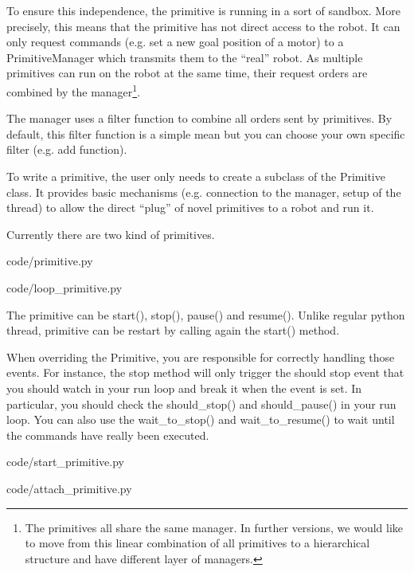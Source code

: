 To ensure this independence, the primitive is running in a sort of sandbox. More precisely, this means that the primitive has not direct access to the robot. It can only request commands (e.g. set a new goal position of a motor) to a PrimitiveManager which transmits them to the “real” robot. As multiple primitives can run on the robot at the same time, their request orders are combined by the manager\footnote{The primitives all share the same manager. In further versions, we would like to move from this linear combination of all primitives to a hierarchical structure and have different layer of managers.}.

The manager uses a filter function to combine all orders sent by primitives. By default, this filter function is a simple mean but you can choose your own specific filter (e.g. add function).

To write a primitive, the user only needs to create a subclass of the Primitive class. It provides basic mechanisms (e.g. connection to the manager, setup of the thread) to allow the direct “plug” of novel primitives to a robot and run it.

Currently there are two kind of primitives.



    {code/primitive.py}


    {code/loop_primitive.py}

The primitive can be start(), stop(), pause() and resume(). Unlike regular python thread, primitive can be restart by calling again the start() method.

When overriding the Primitive, you are responsible for correctly handling those events. For instance, the stop method will only trigger the should stop event that you should watch in your run loop and break it when the event is set. In particular, you should check the should\_stop() and should\_pause() in your run loop. You can also use the wait\_to\_stop() and wait\_to\_resume() to wait until the commands have really been executed.



    {code/start_primitive.py}


    {code/attach_primitive.py}






